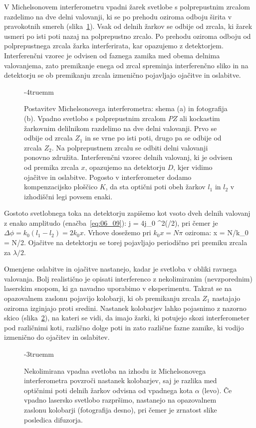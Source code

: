 V Michelsonovem interferometru vpadni žarek svetlobe s polprepustnim zrcalom razdelimo 
na dve delni valovanji, ki se po prehodu oziroma odboju širita v pravokotnih 
smereh (slika~\ref{fig:06_Michelson}). Vsak od delnih žarkov se odbije od zrcala, 
ki žarek usmeri po isti poti nazaj na polprepustno zrcalo. Po prehodu oziroma odboju
od polprepustnega zrcala žarka interferirata, kar opazujemo z detektorjem. 
Interferenčni vzorec je odvisen od faznega zamika med obema delnima valovanjema, 
zato premikanje enega od zrcal spreminja interferenčno sliko in na detektorju 
se ob premikanju zrcala izmenično pojavljajo ojačitve in oslabitve.
\begin{figure}[ht]
\centering
\def\svgwidth{130truemm} 

\caption{Postavitev Michelsonovega interferometra: shema (a) in fotografija (b). 
Vpadno svetlobo s polprepustnim zrcalom $PZ$ ali kockastim žarkovnim 
delilnikom razdelimo na dve delni valovanji. 
Prvo se odbije od zrcala $Z_1$ in se vrne po isti poti, drugo pa se odbije od 
zrcala $Z_2$. Na polprepustnem zrcalu se odbiti delni valovanji 
ponovno združita. Interferenčni vzorec delnih valovanj, ki je odvisen
od premika zrcala $x$, opazujemo na detektorju $D$, kjer vidimo ojačitve
in oslabitve. Pogosto v interferometer dodamo kompenzacijsko
ploščico $K$, da sta optični poti obeh žarkov $l_1$ in $l_2$ v izhodiščni 
legi povsem enaki. 
}
\label{fig:06_Michelson}
\vglue-4truemm
\end{figure}

Gostoto svetlobnega toka na detektorju zapišemo kot vsoto 
dveh delnih valovanj z enako amplitudo (enačba~\ref{eq:06_09}):
\beq
j = 4j_0 \cos^2(\Delta \phi/2),
\label{eq:06_24}
\eeq
pri čemer je $\Delta \phi = k_0(l_1-l_2) = 2 k_0 x$. Vrhove dosežemo pri 
$k_0 x = N \pi$ oziroma:
\beq
x = N\pi/k_0 = N\lambda/2.
\label{eq:06_25}
\eeq
Ojačitve na detektorju se torej pojavljajo periodično pri premiku zrcala za $\lambda/2$. 

Omenjene oslabitve in ojačitve nastanejo, kadar je svetloba v obliki ravnega valovanja.
Bolj realistično je opisati interferenco z nekolimiranim (nevzporednim) laserskim snopom, ki ga
navadno uporabimo v eksperimentu. Takrat se na opazovalnem zaslonu pojavijo 
kolobarji, ki ob premikanju zrcala $Z_1$ nastajajo oziroma izginjajo proti 
sredini. Nastanek kolobarjev lahko pojasnimo z nazorno skico 
(slika~\ref{fig:06_kolobarji}), na kateri se vidi, da imajo žarki, 
ki potujejo skozi interferometer pod različnimi 
koti, različno dolge poti in zato različne fazne zamike, ki vodijo izmenično
do ojačitev in oslabitev.
\begin{figure}[ht]
\centering
\def\svgwidth{100truemm} 

\caption{Nekolimirana vpadna svetloba na izhodu iz Michelsonovega interferometra
povzroči nastanek kolobarjev, saj je razlika med optičnimi poti delnih žarkov
odvisna od vpadnega kota $\alpha$ (levo). Če vpadno lasersko svetlobo razpršimo,
nastanejo na opazovalnem zaslonu kolobarji (fotografija desno), 
pri čemer je zrnatost slike posledica difuzorja.
}
\vglue-3truemm
\label{fig:06_kolobarji}
\end{figure}

